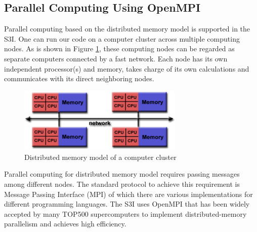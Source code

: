 \documentclass[11pt,titlepage]{article}
\theoremstyle{plain}
\theoremstyle{definition}
\theoremstyle{remark}
\numberwithin{equation}{section}
\begin{document}
\subsection{Parallel Computing Using OpenMPI}
Parallel computing based on the distributed memory model is supported in the S3I. One can run our code on a computer cluster across multiple computing nodes. As is shown in Figure \ref{fig:distrMemModel}, these computing nodes can be regarded as separate computers connected by a fast network. Each node has its own independent processor(s) and memory, takes charge of its own calculations and communicates with its direct neighboring nodes.
\begin{figure}[htbp]
\centering
\includegraphics[width=0.7\textwidth]{Fig/MPI_MultipleCPU.pdf}
\caption{Distributed memory model of a computer cluster}
\label{fig:distrMemModel}
\end{figure}

Parallel computing for distributed memory model requires passing messages among different nodes. The standard protocol to achieve this requirement is Message Passing Interface (MPI) of which there are various implementations for different programming languages. The S3I uses OpenMPI\cite{Gabriel:2004aa} that has been widely accepted by many TOP500 supercomputers to implement distributed-memory parallelism and achieves high efficiency.
\end{document}
